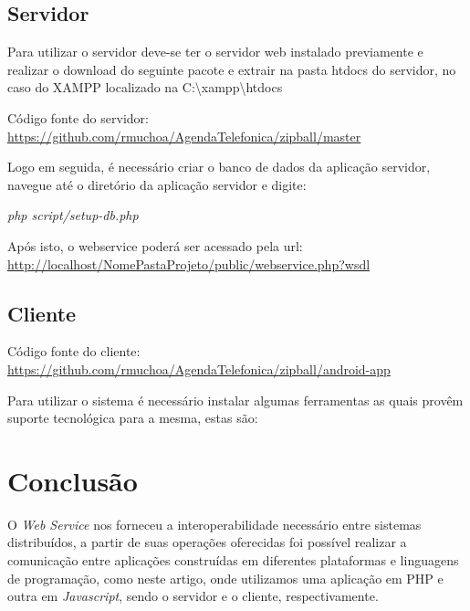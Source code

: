 \documentclass{acm_proc_article-sp}
\begin{document}
	\subsection{Servidor}
	
		Para utilizar o servidor deve-se ter o servidor web instalado previamente e realizar o download do seguinte pacote e extrair na pasta htdocs do servidor, no caso do XAMPP localizado na C:\textbackslash xampp\textbackslash htdocs
	
		Código fonte do servidor: \url{https://github.com/rmuchoa/AgendaTelefonica/zipball/master}
		
		Logo em seguida, é necessário criar o banco de dados da aplicação servidor, navegue até o diretório da aplicação servidor e digite: 
		
			\emph{php script/setup-db.php}
		
		Após isto, o webservice poderá ser acessado pela url: \url{http://localhost/NomePastaProjeto/public/webservice.php?wsdl}
	
	\subsection{Cliente}
	
		Código fonte do cliente: \url{https://github.com/rmuchoa/AgendaTelefonica/zipball/android-app}
	
	Para utilizar o sistema é necessário instalar algumas ferramentas as quais provêm suporte tecnológica para a mesma, estas são:
	
	
	
	
	
	
\section{Conclusão}
	
	O \emph{Web Service} nos forneceu a interoperabilidade necessário entre sistemas distribuídos, a partir de suas operações oferecidas foi possível realizar a comunicação entre aplicações construídas em diferentes plataformas e linguagens de programação, como neste artigo, onde utilizamos uma aplicação em PHP e outra em \emph{Javascript}, sendo o servidor e o cliente, respectivamente. 
	
	

\end{document}
